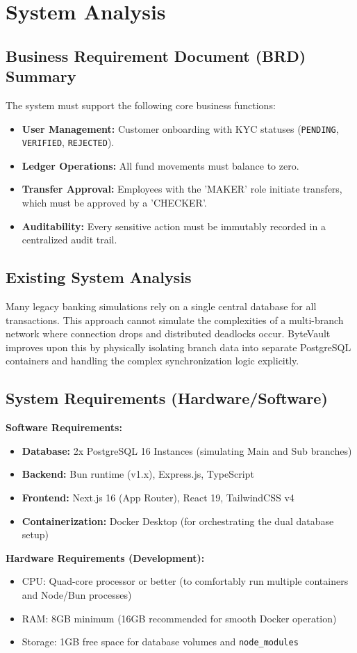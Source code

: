 \chapter{System Analysis}

\section{Business Requirement Document (BRD) Summary}
The system must support the following core business functions:
\begin{itemize}
    \item \textbf{User Management:} Customer onboarding with KYC statuses (\texttt{PENDING}, \texttt{VERIFIED}, \texttt{REJECTED}).
    \item \textbf{Ledger Operations:} All fund movements must balance to zero.
    \item \textbf{Transfer Approval:} Employees with the 'MAKER' role initiate transfers, which must be approved by a 'CHECKER'.
    \item \textbf{Auditability:} Every sensitive action must be immutably recorded in a centralized audit trail.
\end{itemize}

\section{Existing System Analysis}
Many legacy banking simulations rely on a single central database for all transactions. This approach cannot simulate the complexities of a multi-branch network where connection drops and distributed deadlocks occur. ByteVault improves upon this by physically isolating branch data into separate PostgreSQL containers and handling the complex synchronization logic explicitly.

\section{System Requirements (Hardware/Software)}
\textbf{Software Requirements:}
\begin{itemize}
    \item \textbf{Database:} 2x PostgreSQL 16 Instances (simulating Main and Sub branches)
    \item \textbf{Backend:} Bun runtime (v1.x), Express.js, TypeScript
    \item \textbf{Frontend:} Next.js 16 (App Router), React 19, TailwindCSS v4
    \item \textbf{Containerization:} Docker Desktop (for orchestrating the dual database setup)
\end{itemize}

\textbf{Hardware Requirements (Development):}
\begin{itemize}
    \item CPU: Quad-core processor or better (to comfortably run multiple containers and Node/Bun processes)
    \item RAM: 8GB minimum (16GB recommended for smooth Docker operation)
    \item Storage: 1GB free space for database volumes and \texttt{node\_modules}
\end{itemize}
